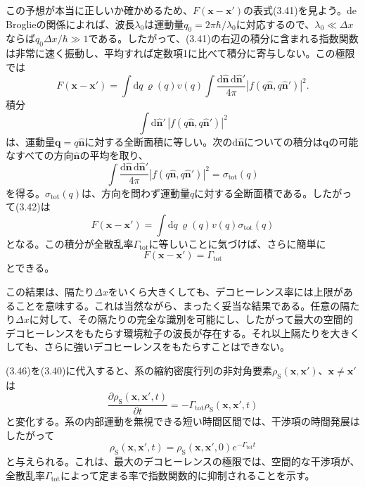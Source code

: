 この予想が本当に正しいか確かめるため、$F(\bm x-\bm x')$の表式(3.41)を見よう。de Broglieの関係によれば、波長$\lambda_0$は運動量$q_0=2\pi\hbar/\lambda_0$に対応するので、$\lambda_0\ll\Delta x$ならば$q_0\Delta x/\hbar\gg1$である。したがって、(3.41)の右辺の積分に含まれる指数関数は非常に速く振動し、平均すれば定数項1に比べて積分に寄与しない。この極限では
\begin{equation}
F(\bm x-\bm x')=\int\mathrm dq\,\varrho(q)v(q)\int\frac{\mathrm d\hat{\bm n}\,\mathrm d\hat{\bm n}'}{4\pi}|f(q\hat{\bm n},q\hat{\bm n}')|^2.
\tag{3.42}
\end{equation}
\hypertarget{srcpage:129}{}\label{srcpage:129}
積分
\begin{equation}
\int\mathrm d\hat{\bm n}'\,|f(q\hat{\bm n},q\hat{\bm n}')|^2
\tag{3.43}
\end{equation}
は、運動量$\bm q=q\hat{\bm n}$に対する全断面積に等しい。次の$\mathrm d\hat{\bm n}$についての積分は$\bm q$の可能なすべての方向$\hat{\bm n}$の平均を取り、
\begin{equation}
\int\frac{\mathrm d\hat{\bm n}\,\mathrm d\hat{\bm n}'}{4\pi}|f(q\hat{\bm n},q\hat{\bm n}')|^2=\sigma_{\mathrm{tot}}(q)
\tag{3.44}
\end{equation}
を得る。$\sigma_{\mathrm{tot}}(q)$は、方向を問わず運動量$q$に対する全断面積である。したがって(3.42)は
\begin{equation}
F(\bm x-\bm x')=\int\mathrm dq\,\varrho(q)v(q)\sigma_{\mathrm{tot}}(q)
\tag{3.45}
\end{equation}
となる。この積分が全散乱率$\Gamma_{\mathrm{tot}}$に等しいことに気づけば、さらに簡単に
\begin{equation}F(\bm x-\bm x')=\Gamma_{\mathrm{tot}}\tag{3.46}\end{equation}
とできる。

この結果は、隔たり$\Delta x$をいくら大きくしても、デコヒーレンス率には上限があることを意味する。これは当然ながら、まったく妥当な結果である。任意の隔たり$\Delta x$に対して、その隔たりの完全な識別を可能にし、したがって最大の空間的デコヒーレンスをもたらす環境粒子の波長が存在する。それ以上隔たりを大きくしても、さらに強いデコヒーレンスをもたらすことはできない。

(3.46)を(3.40)に代入すると、系の縮約密度行列の非対角要素$\rho_{\mathrm S}(\bm x,\bm x')$、$\bm x\ne\bm x'$は
\begin{equation}
\frac{\partial\rho_{\mathrm S}(\bm x,\bm x',t)}{\partial t}=-\Gamma_{\mathrm{tot}}\rho_{\mathrm S}(\bm x,\bm x',t)
\tag{3.47}
\end{equation}
と変化する。系の内部運動を無視できる短い時間区間では、干渉項の時間発展はしたがって
\begin{equation}
\rho_{\mathrm S}(\bm x,\bm x',t)=\rho_{\mathrm S}(\bm x,\bm x',0)e^{-\Gamma_{\mathrm{tot}}t}
\tag{3.48}
\end{equation}
と与えられる。これは、最大のデコヒーレンスの極限では、空間的な干渉項が、全散乱率$\Gamma_{\mathrm{tot}}$によって定まる率で指数関数的に抑制されることを示す。

